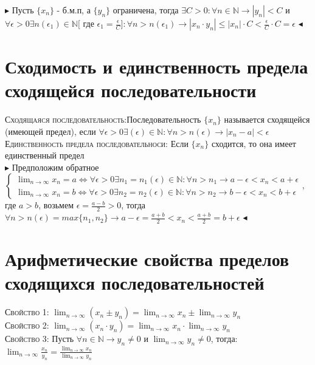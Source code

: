 \documentclass[14pt]{article}
\begin{document}
        $\blacktriangleright$ Пусть $\{x_n\}$ - б.м.п, а $\{y_n\}$ ограничена, тогда $\exists C > 0: \forall n \in \mathbb{N} \rightarrow |y_n| < C $ и $\forall \epsilon > 0 \exists n(\epsilon_1) \in \mathbb{N} [$ где $ \epsilon_1 = \frac{\epsilon}{C}]:\forall n > n(\epsilon_1) \rightarrow |x_n \cdot y_n | \leqslant |x_n| \cdot C < \frac{\epsilon}{C} \cdot C = \epsilon$ $\blacktriangleleft$\\
        
    \section{ Сходимость и единственность предела сходящейся последовательности}
        \textsc{Сходящаяся последовательность:}Последовательность $\{x_n\}$ называется сходящейся (имеющей предел), если $\forall \epsilon > 0 \exists(\epsilon) \in \mathbb{N}: \forall n > n(\epsilon) \rightarrow |x_n - a| < \epsilon$
        \textsc{Единственность предела последовательноси:} Если $\{x_n\}$ сходится, то она имеет единственный предел \\ 
        $\blacktriangleright$ Предположим обратное \\
        $\begin{cases}
            \lim_{n \rightarrow \infty} x_n = a \Leftrightarrow \forall \epsilon > 0 \exists n_1 = n_1(\epsilon) \in \mathbb{N}: \forall n > n_1 \rightarrow a - \epsilon < x_n < a + \epsilon \\
            \lim_{n \rightarrow \infty} x_n = b \Leftrightarrow \forall \epsilon > 0 \exists n_2 = n_2(\epsilon) \in \mathbb{N}: \forall n > n_2 \rightarrow b - \epsilon < x_n < b + \epsilon
        \end{cases}$, где $a > b$, возьмем $\epsilon = \frac{a-b}{2} > 0$, тогда $\forall n > n(\epsilon) = max\{n_1,n_2\} \rightarrow a - \epsilon = \frac{a+b}{2} < x_n < \frac{a+b}{2} = b + \epsilon$
        $\blacktriangleleft$\

    \section{Арифметические свойства пределов сходящихся последовательностей}
        \textsc{Свойство 1:} $\lim_{n \rightarrow \infty} (x_n \pm y_n) = \lim_{n \rightarrow \infty} x_n \pm \lim_{n \rightarrow \infty} y_n$  \\ 
        \textsc{Свойство 2:} $\lim_{n \rightarrow \infty} (x_n \cdot y_n) = \lim_{n \rightarrow \infty} x_n \cdot \lim_{n \rightarrow \infty} y_n$  \\ 
        \textsc{Свойство 3:} Пусть $\forall n \in \mathbb{N} \rightarrow y_n \ne 0$ и $\lim_{n \rightarrow \infty} y_n \ne 0$, тогда: $\lim_{n \rightarrow \infty} \frac{x_n}{y_n} = \frac{\lim_{n \rightarrow \infty} x_n}{\lim_{n \rightarrow \infty} y_n}$\\
\end{document}

